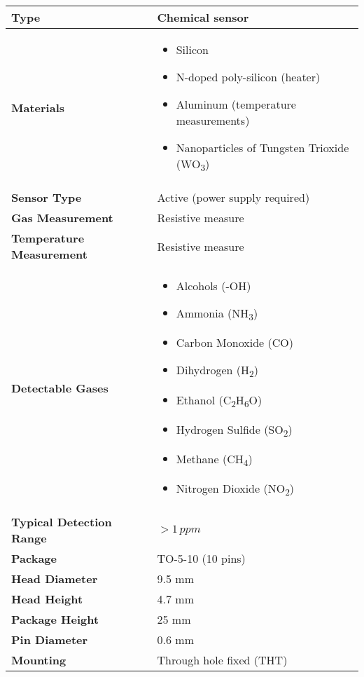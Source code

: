 \documentclass[10pt]{datasheet}
\begin{document}
\begin{table}[h!]
    \centering
    \renewcommand{\arraystretch}{1.1} %
    \setlength{\tabcolsep}{6pt} %
    \small %
    \begin{tabular}{|p{5cm}|p{10cm}|}
        \hline
        \textbf{Type} & Chemical sensor \\
        \hline
        \textbf{Materials} & 
        \begin{itemize}
            \item Silicon
            \item N-doped poly-silicon (heater)
            \item Aluminum (temperature measurements)
            \item Nanoparticles of Tungsten Trioxide (WO\textsubscript{3})
        \end{itemize} \\
        \hline
        \textbf{Sensor Type} & Active (power supply required) \\
        \hline
        \textbf{Gas Measurement} & Resistive measure \\
        \hline
        \textbf{Temperature Measurement} & Resistive measure \\
        \hline
        \textbf{Detectable Gases} & 
        \begin{itemize}
            \item Alcohols (-OH)
            \item Ammonia (NH\textsubscript{3})
            \item Carbon Monoxide (CO)
            \item Dihydrogen (H\textsubscript{2})
            \item Ethanol (C\textsubscript{2}H\textsubscript{6}O)
            \item Hydrogen Sulfide (SO\textsubscript{2})
            \item Methane (CH\textsubscript{4})
            \item Nitrogen Dioxide (NO\textsubscript{2})
        \end{itemize} \\
        \hline
        \textbf{Typical Detection Range} & \(> 1 \, {ppm}\) \\
        \hline
        \textbf{Package} & TO-5-10 (10 pins) \\
        \hline
        \textbf{Head Diameter} & 9.5 mm \\
        \hline
        \textbf{Head Height} & 4.7 mm \\
        \hline
        \textbf{Package Height} & 25 mm \\
        \hline
        \textbf{Pin Diameter} & 0.6 mm \\
        \hline
        \textbf{Mounting} & Through hole fixed (THT) \\
        \hline
    \end{tabular}
\end{table}
\end{document}
